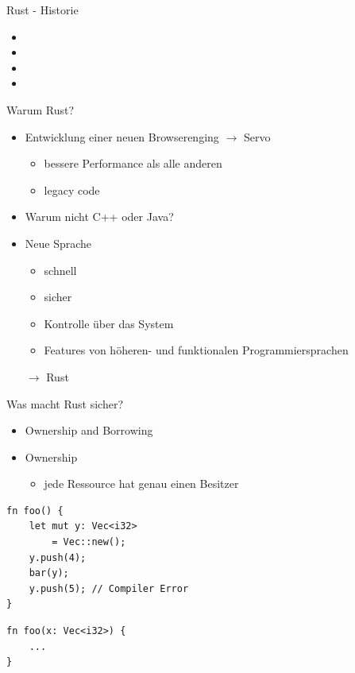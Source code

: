\documentclass[12pt]{beamer}
\begin{document}
\begin{frame}{Rust - Historie}
	\begin{itemize}
	  \item 
	  \item 
	  \item
	  \item 
	 \end{itemize}
\end{frame}

\begin{frame}{Warum Rust?}
	\begin{itemize}
	  \item Entwicklung einer neuen Browserenging $\rightarrow$ Servo
	  \begin{itemize}
	  	\item bessere Performance als alle anderen
	    \item legacy code 
	  \end{itemize}
	  \item[]
	  \item Warum nicht C++ oder Java?
	  \item[]
	  \item Neue Sprache
	  \begin{itemize}
	      \item schnell
	      \item sicher
	      \item Kontrolle über das System
	      \item Features von höheren- und funktionalen Programmiersprachen
	  \end{itemize}
	  \item[$\rightarrow$] Rust
	  \end{itemize}
\end{frame}

\begin{frame}[fragile=singleslide]{Was macht Rust sicher?}
	\begin{itemize}
	    \item Ownership and Borrowing
	\end{itemize}
	\begin{itemize}
	    \item Ownership
	    \begin{itemize}
	        \item jede Ressource hat genau einen Besitzer
	    \end{itemize}    
	\end{itemize}
\begin{minipage}[t]{.49\textwidth}
\begin{lstlisting}
fn foo() {	
	let mut y: Vec<i32> 
		= Vec::new();
	y.push(4);	
	bar(y);	
	y.push(5); // Compiler Error	
}
\end{lstlisting}				
\end{minipage}
\hfill
\begin{minipage}[t]{.49\textwidth}
\begin{lstlisting}
fn foo(x: Vec<i32>) {	
	...
}
\end{lstlisting}				
\end{minipage}
\end{frame}
\end{document}
